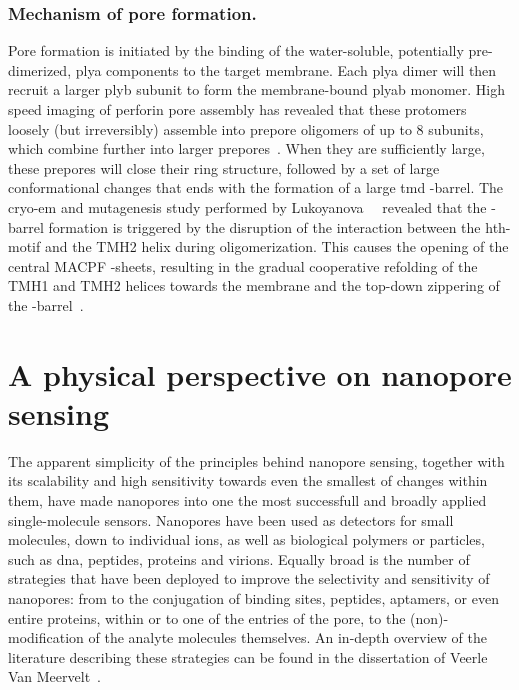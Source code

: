 \subsubsection{Mechanism of pore formation.}
%

Pore formation is initiated by the binding of the water-soluble, potentially pre-dimerized, \gls{plya}
components to the target membrane. Each \gls{plya} dimer will then recruit a larger \gls{plyb} subunit to form
the membrane-bound \gls{plyab} monomer. High speed imaging of perforin pore assembly has revealed that these
protomers loosely (but irreversibly) assemble into prepore oligomers of up to 8 subunits, which combine
further into larger prepores~\cite{Leung-2017}. When they are sufficiently large, these prepores will close
their ring structure, followed by a set of large conformational changes that ends with the formation of a
large \gls{tmd} \tb-barrel. The \gls{cryo-em} and mutagenesis study performed by
Lukoyanova~\etal{}~\cite{Lukoyanova-Kondos-2015} revealed that the \tb-barrel formation is triggered by the
disruption of the interaction between the \gls{hth}-motif and the {TMH2} helix during oligomerization. This
causes the opening of the central {MACPF} \tb-sheets, resulting in the gradual cooperative refolding of the
{TMH1} and {TMH2} helices towards the membrane and the top-down zippering of the
\tb-barrel~\cite{Reboul-2016}.


%
\clearpage
%

%
%
\section{A physical perspective on nanopore sensing}
%
\label{sec:np:physical_perspective}
%

The apparent simplicity of the principles behind nanopore sensing, together with its scalability and high
sensitivity towards even the smallest of changes within them, have made nanopores into one the most
successfull and broadly applied single-molecule sensors. Nanopores have been used as detectors for small
molecules, down to individual ions, as well as biological polymers or particles, such as \gls{dna}, peptides,
proteins and virions. Equally broad is the number of strategies that have been deployed to improve the
selectivity and sensitivity of nanopores: from to the conjugation of binding sites, peptides, aptamers, or
even entire proteins, within or to one of the entries of the pore, to the (non)-modification of the analyte
molecules themselves. An in-depth overview of the literature describing these strategies can be found in the
dissertation of Veerle Van Meervelt~\cite{VanMeervelt-2017-PhD}.

